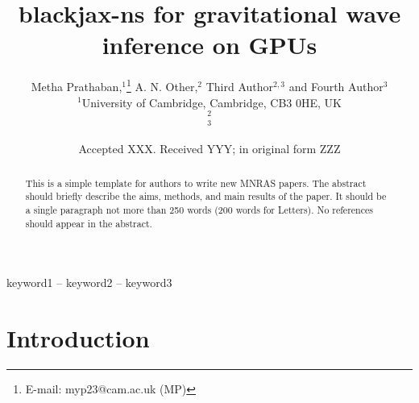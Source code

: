 \documentclass[fleqn,usenatbib]{mnras}
\title[Short title, max. 45 characters]{blackjax-ns for gravitational wave inference on GPUs}
\author[Metha Prathaban et al.]{
Metha Prathaban,$^{1}$\thanks{E-mail: myp23@cam.ac.uk (MP)}
A. N. Other,$^{2}$
Third Author$^{2,3}$
and Fourth Author$^{3}$
\\
$^{1}$University of Cambridge, Cambridge, CB3 0HE, UK\\
$^{2}$\\
$^{3}$
}
\date{Accepted XXX. Received YYY; in original form ZZZ}
\begin{document}
\label{firstpage}
\pagerange{\pageref{firstpage}--\pageref{lastpage}}
\maketitle

\begin{abstract}
This is a simple template for authors to write new MNRAS papers.
The abstract should briefly describe the aims, methods, and main results of the paper.
It should be a single paragraph not more than 250 words (200 words for Letters).
No references should appear in the abstract.
\end{abstract}

\begin{keywords}
keyword1 -- keyword2 -- keyword3
\end{keywords}



\section{Introduction}






\end{document}
